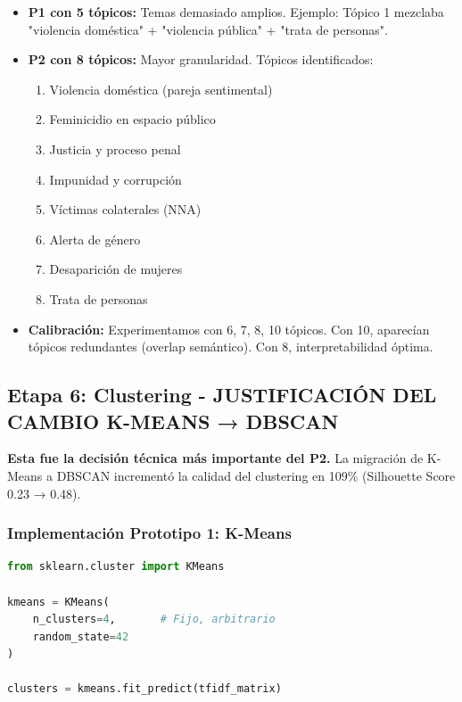 \begin{itemize}
    \item \textbf{P1 con 5 tópicos:} Temas demasiado amplios. Ejemplo: Tópico 1 mezclaba "violencia doméstica" + "violencia pública" + "trata de personas".
    
    \item \textbf{P2 con 8 tópicos:} Mayor granularidad. Tópicos identificados:
    \begin{enumerate}
        \item Violencia doméstica (pareja sentimental)
        \item Feminicidio en espacio público
        \item Justicia y proceso penal
        \item Impunidad y corrupción
        \item Víctimas colaterales (NNA)
        \item Alerta de género
        \item Desaparición de mujeres
        \item Trata de personas
    \end{enumerate}
    
    \item \textbf{Calibración:} Experimentamos con 6, 7, 8, 10 tópicos. Con 10, aparecían tópicos redundantes (overlap semántico). Con 8, interpretabilidad óptima.
\end{itemize}

\subsection{Etapa 6: Clustering - JUSTIFICACIÓN DEL CAMBIO K-MEANS → DBSCAN}
\label{subsec:justificacion_dbscan}

\textbf{Esta fue la decisión técnica más importante del P2.} La migración de K-Means a DBSCAN incrementó la calidad del clustering en 109\% (Silhouette Score 0.23 → 0.48).

\subsubsection{Implementación Prototipo 1: K-Means}

\begin{lstlisting}[language=Python, caption={Clustering K-Means del P1}]
from sklearn.cluster import KMeans

kmeans = KMeans(
    n_clusters=4,       # Fijo, arbitrario
    random_state=42
)

clusters = kmeans.fit_predict(tfidf_matrix)
\end{lstlisting}

